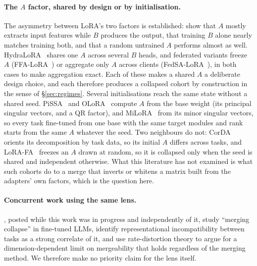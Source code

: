 \paragraph{The $A$ factor, shared by design or by initialisation.} The
asymmetry between LoRA's two factors is established:
\citet{zhu2024asymmetry} show that $A$ mostly extracts input features while
$B$ produces the output, that training $B$ alone nearly matches training
both, and that a random untrained $A$ performs almost as well.
HydraLoRA~\citep{tian2024hydralora} shares one $A$ across several $B$ heads,
and federated variants freeze $A$ (FFA-LoRA~\citep{sun2024ffalora}) or
aggregate only $A$ across clients (FedSA-LoRA~\citep{guo2025fedsalora}), in
both cases to make aggregation exact. Each of these makes a shared $A$ a
deliberate design choice, and each therefore produces a collapsed cohort by
construction in the sense of \S\ref{sec:regimes}. Several initialisations
reach the same state without a shared seed. PiSSA~\citep{meng2024pissa} and
OLoRA~\citep{buyukakyuz2024olora} compute $A$ from the base weight (its
principal singular vectors, and a QR factor), and
MiLoRA~\citep{wang2025milora} from its minor singular vectors, so every task
fine-tuned from one base with the same target modules and rank starts from
the same $A$ whatever the seed. Two neighbours do not: CorDA~\citep{yang2024corda}
orients its decomposition by task data, so its initial $A$ differs across
tasks, and LoRA-FA~\citep{zhang2023lorafa} freezes an $A$ drawn at random, so
it is collapsed only when the seed is shared and independent otherwise. What
this literature has not examined is what such cohorts do to a merge that
inverts or whitens a matrix built from the adapters' own factors, which is
the question here.

\paragraph{Concurrent work using the same lens.} \citet{cao2026collapse},
posted while this work was in progress and independently of it, study
``merging collapse'' in fine-tuned LLMs, identify representational
incompatibility between tasks as a strong correlate of it, and use
rate-distortion theory to argue for a dimension-dependent limit on
mergeability that holds regardless of the merging method. We therefore
make no priority claim for the lens itself.

